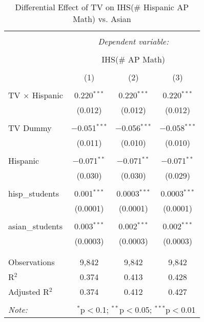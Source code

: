 
\begin{table}[!htbp] \centering 
  \caption{Differential Effect of TV on IHS(\# Hispanic AP Math) vs. Asian} 
  \label{} 
\begin{tabular}{@{\extracolsep{-2pt}}lccc} 
\\[-1.8ex]\hline 
\hline \\[-1.8ex] 
 & \multicolumn{3}{c}{\textit{Dependent variable:}} \\ 
\cline{2-4} 
\\[-1.8ex] & \multicolumn{3}{c}{IHS(\# AP Math)} \\ 
\\[-1.8ex] & (1) & (2) & (3)\\ 
\hline \\[-1.8ex] 
 TV $\times$ Hispanic & 0.220$^{***}$ & 0.220$^{***}$ & 0.220$^{***}$ \\ 
  & (0.012) & (0.012) & (0.012) \\ 
  & & & \\ 
 TV Dummy & $-$0.051$^{***}$ & $-$0.056$^{***}$ & $-$0.058$^{***}$ \\ 
  & (0.011) & (0.010) & (0.010) \\ 
  & & & \\ 
 Hispanic & $-$0.071$^{**}$ & $-$0.071$^{**}$ & $-$0.071$^{**}$ \\ 
  & (0.030) & (0.030) & (0.029) \\ 
  & & & \\ 
 hisp\_students & 0.001$^{***}$ & 0.0003$^{***}$ & 0.0003$^{***}$ \\ 
  & (0.0001) & (0.0001) & (0.0001) \\ 
  & & & \\ 
 asian\_students & 0.003$^{***}$ & 0.002$^{***}$ & 0.002$^{***}$ \\ 
  & (0.0003) & (0.0003) & (0.0003) \\ 
  & & & \\ 
\hline \\[-1.8ex] 
Observations & 9,842 & 9,842 & 9,842 \\ 
R$^{2}$ & 0.374 & 0.413 & 0.428 \\ 
Adjusted R$^{2}$ & 0.374 & 0.412 & 0.427 \\ 
\hline 
\hline \\[-1.8ex] 
\textit{Note:}  & \multicolumn{3}{r}{$^{*}$p$<$0.1; $^{**}$p$<$0.05; $^{***}$p$<$0.01} \\ 
\end{tabular} 
\end{table} 
